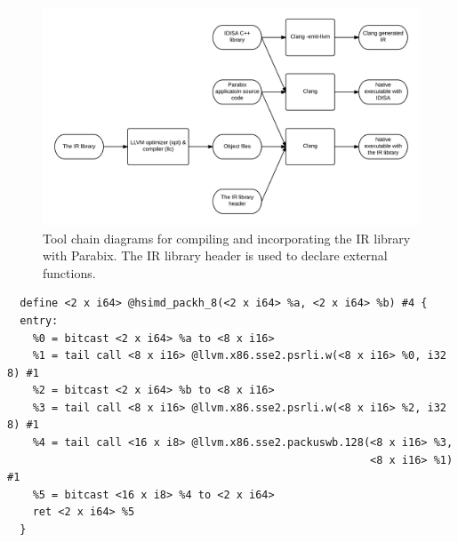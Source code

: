 \begin{figure}[htbp!]
\centering
\includegraphics[width=140mm]{draw/tool_chain_diagrams.png}
\caption[Tool chain diagrams for compiling and incorporating the IR library with Parabix]{Tool chain diagrams for compiling and incorporating the IR library with Parabix. The IR library header is used to declare external functions.}
\label{fig:tool_chain_diagrams}
\end{figure}

\begin{program}
\begin{verbatim}
  define <2 x i64> @hsimd_packh_8(<2 x i64> %a, <2 x i64> %b) #4 {
  entry:
    %0 = bitcast <2 x i64> %a to <8 x i16>
    %1 = tail call <8 x i16> @llvm.x86.sse2.psrli.w(<8 x i16> %0, i32 8) #1
    %2 = bitcast <2 x i64> %b to <8 x i16>
    %3 = tail call <8 x i16> @llvm.x86.sse2.psrli.w(<8 x i16> %2, i32 8) #1
    %4 = tail call <16 x i8> @llvm.x86.sse2.packuswb.128(<8 x i16> %3,
                                                         <8 x i16> %1) #1
    %5 = bitcast <16 x i8> %4 to <2 x i64>
    ret <2 x i64> %5
  }
\end{verbatim}
\caption{Clang-generated IR for {\tt hsimd<8>::packh} from compiling the IDISA function}
\label{prog:packh_8_sse2_llvm}
\end{program}

